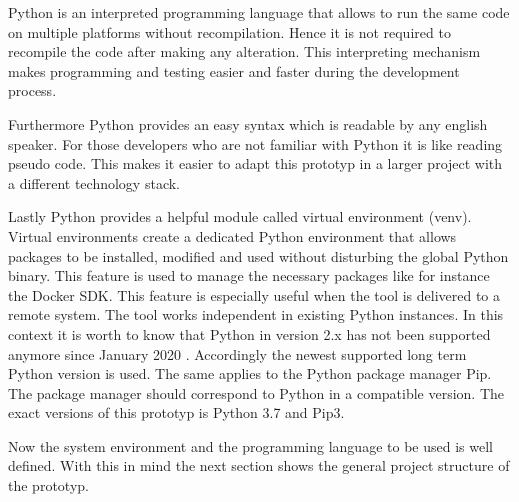 Python is an interpreted programming language that allows to run the same code on multiple platforms without recompilation. 
Hence it is not required to recompile the code after making any alteration. 
This interpreting mechanism makes programming and testing easier and faster during the development process.

Furthermore Python provides an easy syntax which is readable by any english speaker. 
For those developers who are not familiar with Python it is like reading pseudo code. 
This makes it easier to adapt this prototyp in a larger project with a different technology stack.

Lastly Python provides a helpful module called virtual environment (venv). 
Virtual environments create a dedicated Python environment that allows packages to be installed, modified and used without disturbing the global Python binary. 
This feature is used to manage the necessary packages like for instance the Docker SDK. 
This feature is especially useful when the tool is delivered to a remote system. 
The tool works independent in existing Python instances. 
In this context it is worth to know that Python in version 2.x has not been supported anymore since January 2020 \cite{python_deprecated}. 
Accordingly the newest supported long term Python version is used. 
The same applies to the Python package manager Pip. 
The package manager should correspond to Python in a compatible version. 
The exact versions of this prototyp is Python 3.7 and Pip3.

Now the system environment and the programming language to be used is well defined. 
With this in mind the next section shows the general project structure of the prototyp.